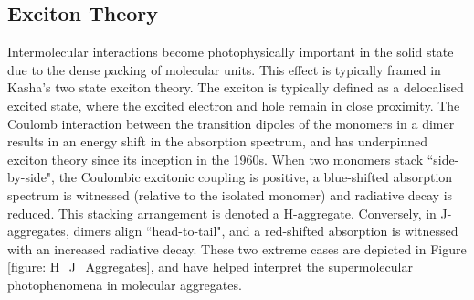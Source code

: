 \subsection{Exciton Theory}\label{section: lom intermolecular-interactions}
Intermolecular interactions become photophysically important in the solid state due to the dense packing of molecular units. This effect is typically framed in Kasha's two state exciton theory.\cite{Gierschner2009,Gierschner2013,Gierschner2013a,Hestand2017,Shi2017} The exciton is typically defined as a delocalised excited state, where the excited electron and hole remain in close proximity. The Coulomb interaction between the transition dipoles of the monomers in a dimer results in an energy shift in the absorption spectrum, and has underpinned exciton theory since its inception in the 1960s.\cite{Kasha1965a} When two monomers stack ``side-by-side", the Coulombic excitonic coupling is positive, a blue-shifted absorption spectrum is witnessed (relative to the isolated monomer) and radiative decay is reduced. This stacking arrangement is denoted a H-aggregate. Conversely, in J-aggregates, dimers align ``head-to-tail", and a red-shifted absorption is witnessed with an increased radiative decay. These two extreme cases are depicted in Figure \ref{figure: H_J_Aggregates}, and have helped interpret the supermolecular photophenomena in molecular aggregates.

